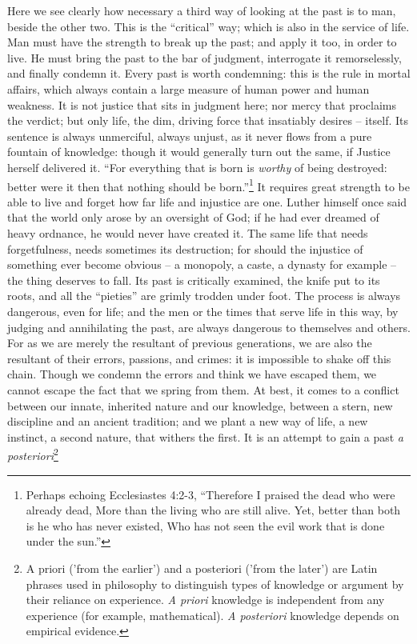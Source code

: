 Here we see clearly how necessary a third way of looking at the past
is to man, beside the other two. This is the \enquote{critical} way; which is
also in the service of life. Man must have the strength to break up
the past; and apply it too, in order to live. He must bring the past
to the bar of judgment, interrogate it remorselessly, and finally
condemn it. Every past is worth condemning: this is the rule in
mortal affairs, which always contain a large measure of human power
and human weakness. It is not justice that sits in judgment here; nor
mercy that proclaims the verdict; but only life, the dim, driving
force that insatiably desires -- itself. Its sentence is always
unmerciful, always unjust, as it never flows from a pure fountain of
knowledge: though it would generally turn out the same, if Justice
herself delivered it. \enquote{For everything that is born is \textit{worthy} of
being destroyed: better were it then that nothing should be born.}\footnote{Perhaps echoing Ecclesiastes 4:2-3, \enquote{Therefore I praised the dead who were already dead, More than the living who are still alive. Yet, better than both is he who has never existed, Who has not seen the evil work that is done under the sun.}} It
requires great strength to be able to live and forget how far life
and injustice are one. Luther himself once said that the world only
arose by an oversight of God; if he had ever dreamed of heavy
ordnance, he would never have created it. The same life that needs
forgetfulness, needs sometimes its destruction; for should the
injustice of something ever become obvious -- a monopoly, a caste, a
dynasty for example -- the thing deserves to fall. Its past is
critically examined, the knife put to its roots, and all the
\enquote{pieties} are grimly trodden under foot. The process is always
dangerous, even for life; and the men or the times that serve life in
this way, by judging and annihilating the past, are always dangerous
to themselves and others. For as we are merely the resultant of
previous generations, we are also the resultant of their errors,
passions, and crimes: it is impossible to shake off this chain.
Though we condemn the errors and think we have escaped them, we
cannot escape the fact that we spring from them. At best, it comes to
a conflict between our innate, inherited nature and our knowledge,
between a stern, new discipline and an ancient tradition; and we
plant a new way of life, a new instinct, a second nature, that
withers the first. It is an attempt to gain a past \textit{a posteriori}\footnote{A priori ('from the earlier') and a posteriori ('from the later') are Latin phrases used in philosophy to distinguish types of knowledge or argument by their reliance on experience. \textit{A priori} knowledge is independent from any experience (for example, mathematical). \textit{A posteriori} knowledge depends on empirical evidence.}
